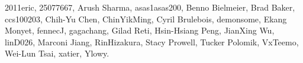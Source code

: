 2011eric,                      %
25077667,                      %
Arush Sharma,                  %
asas1asas200,                  %
Benno Bielmeier,               %
Brad Baker,                    %
ccs100203,                     %
Chih-Yu Chen,                  %
ChinYikMing,                   %
Cyril Brulebois,               %
demonsome,                     %
Ekang Monyet,                  %
fennecJ,                       %
gagachang,                     %
Gilad Reti,                    %
Hsin-Hsiang Peng,              %
JianXing Wu,                   %
linD026,                       %
Marconi Jiang,                 %
RinHizakura,                   %
Stacy Prowell,                 %
Tucker Polomik,                %
VxTeemo,                       %
Wei-Lun Tsai,                  %
xatier,                        %
Ylowy.                         %
